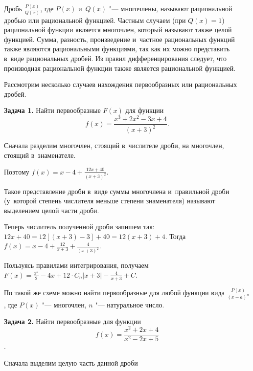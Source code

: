 
Дробь $\displaystyle \frac{P(x)}{Q(x)}$, где $P(x)$ и~$Q(x)$ "--- многочлены,
называют рациональной дробью или рациональной функцией.
Частным случаем (при $Q(x) = 1$) рациональной функции является многочлен,
который называют также целой функцией. Сумма, разность, произведение
и~частное рациональных функций также являются рациональными функциями,
так как их можно представить в~виде рациональных дробей.
Из правил дифференцирования следует, что производная рациональной функции
также является рациональной функцией.

Рассмотрим несколько случаев нахождения первообразных или рациональных дробей.

\textbf{Задача 1.}\label{ex:5_8_1} Найти первообразные $F(x)$ для функции
$$\displaystyle f(x) = \frac{x^{3} + 2x^{2} - 3x + 4}{(x + 3)^{2}}.$$

Сначала разделим многочлен, стоящий в~числителе дроби, на многочлен,
стоящий в~знаменателе.


Поэтому $\displaystyle f(x) = x - 4 + \frac{12x + 40}{(x + 3)^{2}}$.

Такое представление дроби в~виде суммы многочлена и~правильной дроби
(у~которой степень числителя меньше степени знаменателя) называют
выделением целой части дроби.

Теперь числитель полученной дроби запишем так:
$12x + 40 = 12 \left[ (x + 3) - 3 \right] + 40 = 12(x + 3) + 4$.
Тогда
$\displaystyle f(x) = x - 4 + \frac{12}{x + 3} + \frac{4}{(x + 3)^{2}}$.

Пользуясь правилами интегрирования, получаем
$\displaystyle F(x) = \frac{x^{2}}{2} - 4x + 12 \cdot C_{n} |x + 3| - \frac{4}{x + 3} + C$.

По такой же схеме можно найти первообразные для любой функции вида
$\displaystyle \frac{P(x)}{(x - a)^{n}}$,
где $P(x)$ "--- многочлен, $n$ "--- натуральное число.

\textbf{Задача 2.}\label{ex:5_8_2} Найти первообразные для функции
$$\displaystyle f(x) = \frac{x^{2} + 2x + 4}{x^{2} - 2x + 5}$$.

Сначала выделим целую часть данной дроби


